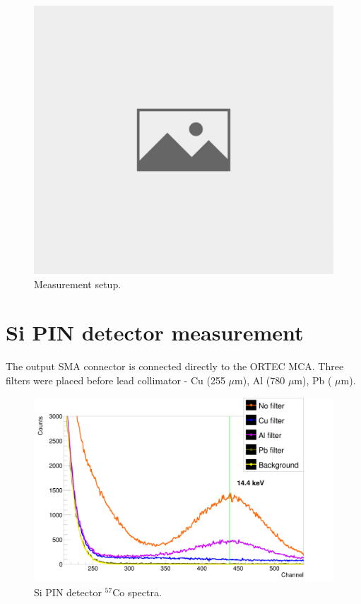 \begin{figure}[H]
 \centering
 \includegraphics[scale=0.8, angle = 90]{./pictures/NoPicture.jpg}
 \caption{Measurement setup.}
 \label{meas setup}
 
\end{figure}

\section{Si PIN detector measurement}

The output SMA connector is connected directly to the ORTEC MCA.
Three filters were placed before lead collimator - Cu (255 $\mu$m), Al (780 $\mu$m), Pb ( $\mu$m).

\begin{figure}[H]
 \centering
 \includegraphics[scale=0.125, angle = 0]{./pictures/SemiSpectre.png}
 \caption{Si PIN detector $^{57}$Co spectra.}
 \label{Si PIN detector spectra.}
\end{figure}


